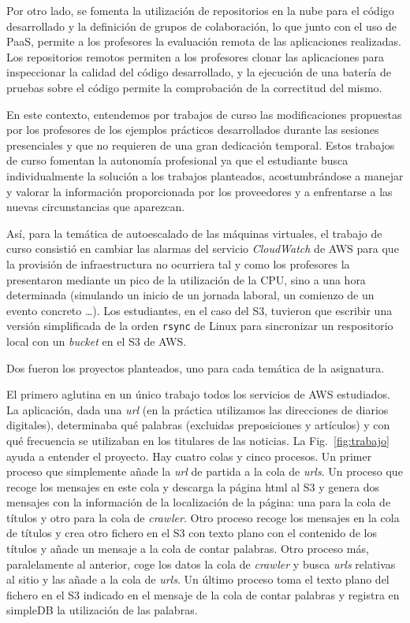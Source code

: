 \documentclass[conference]{IEEEtran}
\begin{document}
Por otro lado, se fomenta la utilización de repositorios en la nube para el código desarrollado y la definición de grupos de colaboración, lo que junto con el uso de PaaS, 
permite a los profesores la evaluación remota de las aplicaciones realizadas.
Los repositorios remotos permiten a los profesores clonar las aplicaciones para inspeccionar la calidad del código desarrollado, y
la ejecución de una batería de pruebas sobre el código permite la comprobación de la correctitud del mismo.


En este contexto, entendemos por trabajos de curso las modificaciones propuestas por los profesores de los ejemplos prácticos desarrollados durante las sesiones presenciales y que no requieren
de una gran dedicación temporal.
Estos trabajos de curso fomentan la autonomía profesional ya que
el estudiante  busca individualmente la solución a los trabajos planteados, acostumbrándose a manejar y valorar la información proporcionada por
los proveedores y a enfrentarse a las nuevas circunstancias que aparezcan.


Así, para la temática de autoescalado de las máquinas virtuales, el trabajo de curso consistió en cambiar las alarmas del servicio \textit{CloudWatch} de AWS para que la provisión de infraestructura
no ocurriera tal y como los profesores la presentaron mediante un pico de la utilización de la CPU,
sino a una hora determinada (simulando un inicio de un jornada laboral, un comienzo de un evento concreto \dots). Los estudiantes, en el caso del S3, tuvieron que escribir una versión simplificada
de la orden \texttt{rsync} de Linux para sincronizar un respositorio local con un \textit{bucket} en el S3 de AWS.
 

Dos fueron los proyectos planteados, uno para cada temática de la asignatura.


El primero aglutina en un único trabajo todos los servicios de AWS estudiados. La aplicación, dada una \textit{url}
(en la práctica utilizamos las direcciones de diarios digitales), determinaba qué palabras (excluidas preposiciones y artículos) y con qué frecuencia
se utilizaban en los titulares de las noticias. La Fig.~\ref{fig:trabajo} ayuda a entender el proyecto.
Hay cuatro colas y cinco procesos. Un primer proceso  que simplemente añade la \textit{url} de partida a la cola de \textit{urls}.
Un proceso que recoge los mensajes en este cola y descarga la página html al S3 y genera dos mensajes con la información de la localización
de la página: una para la cola de títulos y otro para la cola  de \textit{crawler}.
Otro proceso  recoge los mensajes en la cola de títulos y crea otro fichero en el S3 con texto plano con el contenido de los títulos y añade un mensaje a la cola de contar palabras.
Otro proceso más, paralelamente al anterior, coge los datos la cola de \textit{crawler} y busca \textit{urls} relativas al sitio y las añade a la cola de \textit{urls}.
Un último proceso toma el texto plano del fichero en el S3 indicado en el mensaje de la cola de contar palabras y registra en simpleDB la utilización de las palabras.
\end{document}
